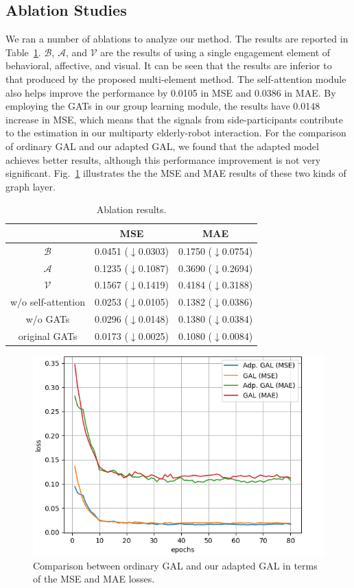 \documentclass[VANCOUVER,STIX1COL]{WileyNJD-v2}
\begin{document}
\subsection{Ablation Studies}
\label{subs:Ablation_Studies}

We ran a number of ablations to analyze our method. The results are reported in Table~\ref{t:ablations}. $\mathcal{B}$, $\mathcal{A}$, and $\mathcal{V}$ are the results of using a single engagement element of behavioral, affective, and visual. It can be seen that the results are inferior to that produced by the proposed multi-element method. The self-attention module also helps improve the performance by 0.0105 in MSE and 0.0386 in MAE. By employing the GATs in our group learning module, the results have 0.0148 increase in MSE, which means that the signals from side-participants contribute to the estimation in our multiparty elderly-robot interaction. For the comparison of ordinary GAL and our adapted GAL, we found that the adapted model achieves better results, although this performance improvement is not very significant. Fig.~\ref{f:gal_vs_adpgal} illustrates the the MSE and MAE results of these two kinds of graph layer.

\begin{table}[hb]
  \centering
  \caption{Ablation results.}
  \label{t:ablations}
  \begin{tabular}{ccc}
  \toprule
  \textbf{} & \textbf{MSE} & \textbf{MAE} \\
  \midrule
  $\mathcal{B}$ & 0.0451 ($\downarrow$0.0303) & 0.1750 ($\downarrow$0.0754) \\
  $\mathcal{A}$ & 0.1235 ($\downarrow$0.1087) & 0.3690 ($\downarrow$0.2694) \\
  $\mathcal{V}$ & 0.1567 ($\downarrow$0.1419) & 0.4184 ($\downarrow$0.3188) \\
  w/o self-attention & 0.0253 ($\downarrow$0.0105) & 0.1382 ($\downarrow$0.0386) \\
  w/o GATs & 0.0296 ($\downarrow$0.0148) & 0.1380 ($\downarrow$0.0384) \\
  original GATs & 0.0173 ($\downarrow$0.0025) & 0.1080 ($\downarrow$0.0084) \\
  \bottomrule
  \end{tabular}
\end{table}

\begin{figure}[hb]
  \centering
  \includegraphics[width=0.6\linewidth]{assets/gal_vs_adpgal}
  \caption{Comparison between ordinary GAL and our adapted GAL in terms of the MSE and MAE losses.}
  \label{f:gal_vs_adpgal}
\end{figure}
\end{document}
